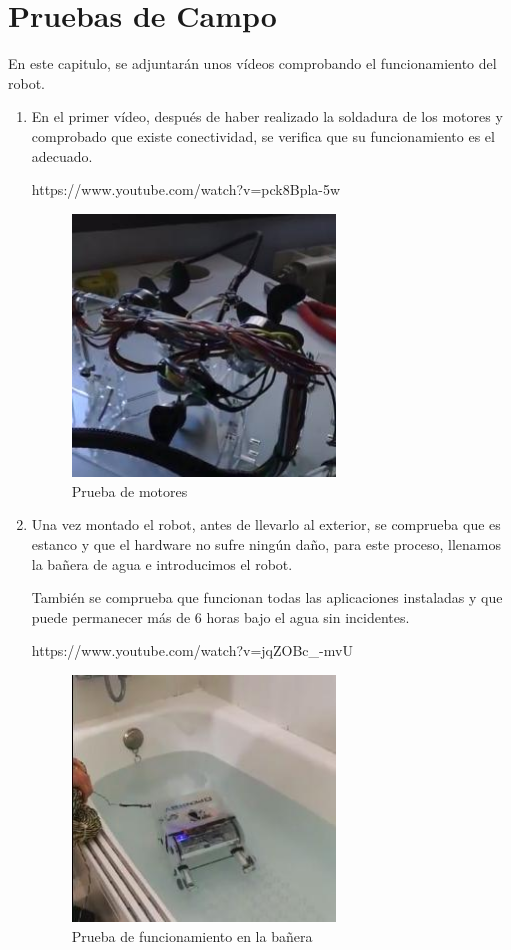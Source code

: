 \chapter{Pruebas de Campo}

En este capitulo, se adjuntarán unos vídeos comprobando el funcionamiento del robot.

\begin{enumerate}
\item En el primer vídeo, después de haber realizado la soldadura de los motores y comprobado que existe conectividad, se verifica que su funcionamiento es el adecuado.
 
https://www.youtube.com/watch?v=pck8Bpla-5w
 
 \begin{figure} [hbtp]
  \begin{center}
    \includegraphics[width=7cm]{img/cap5/motores}
  \end{center}
  \caption{Prueba de motores}
  \label{fig:motores}
 \end{figure}

\item Una vez montado el robot, antes de llevarlo al exterior, se comprueba que es estanco y que el hardware no sufre ningún daño, para este proceso, llenamos la bañera de agua e introducimos el robot.
 
También se comprueba que funcionan todas las aplicaciones instaladas y que puede permanecer más de 6 horas bajo el agua sin incidentes.

https://www.youtube.com/watch?v=jqZOBc\_-mvU
\newpage
 \begin{figure} [hbtp]
  \begin{center}
    \includegraphics[width=7cm]{img/cap5/banera}
  \end{center}
  \caption{Prueba de funcionamiento en la bañera}
  \label{fig:banera}
 \end{figure}
 



\end{enumerate}
